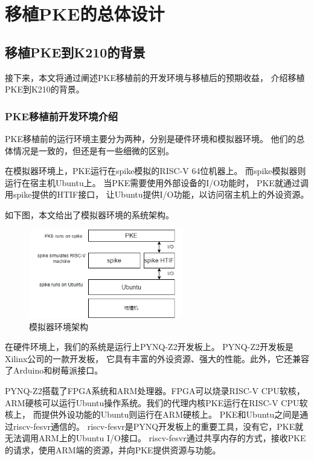 
\chapter{移植PKE的总体设计}

\section{移植PKE到K210的背景}

接下来，本文将通过阐述PKE移植前的开发环境与移植后的预期收益，
介绍移植PKE到K210的背景。

\subsection{PKE移植前开发环境介绍}

PKE移植前的运行环境主要分为两种，分别是硬件环境和模拟器环境。
他们的总体情况是一致的，但还是有一些细微的区别。

在模拟器环境上，PKE运行在spike模拟的RISC-V 64位机器上。
而spike模拟器则运行在宿主机Ubuntu上。
当PKE需要使用外部设备的I/O功能时，
PKE就通过调用spike提供的HTIF接口，
让Ubuntu提供I/O功能，以访问宿主机上的外设资源。

如下图，本文给出了模拟器环境的系统架构。

\begin{figure}[htbp]
    \vspace{13pt} %
    \centering
    \includegraphics[width=0.6\textwidth]{images/spike_structure.png}
    \caption{模拟器环境架构}\label{模拟器环境架构} %
\end{figure}

在硬件环境上，我们的系统是运行上PYNQ-Z2开发板上。
PYNQ-Z2开发板是Xilinx公司的一款开发板，
它具有丰富的外设资源、强大的性能。此外，它还兼容了Arduino和树莓派接口。

PYNQ-Z2搭载了FPGA系统和ARM处理器。FPGA可以烧录RISC-V CPU软核，
ARM硬核可以运行Ubuntu操作系统。我们的代理内核PKE运行在RISC-V CPU软核上，
而提供外设功能的Ubuntu则运行在ARM硬核上。
PKE和Ubuntu之间是通过riscv-fesvr通信的。
riscv-fesvr是PYNQ开发板上的重要工具，没有它，PKE就无法调用ARM上的Ubuntu I/O接口。
riscv-fesvr通过共享内存的方式，接收PKE的请求，使用ARM端的资源，并向PKE提供资源与功能。


